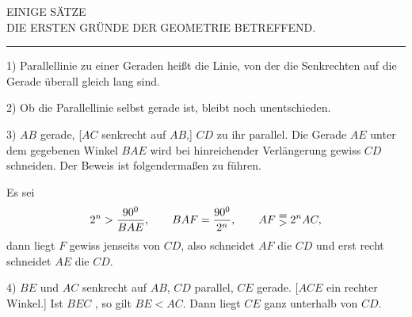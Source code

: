\clearpage
{}
\begin{center}
EINIGE SÄTZE\\
DIE ERSTEN GRÜNDE DER GEOMETRIE BETREFFEND.
\end{center}

\medskip
\begin{center}
\rule{0.15\textwidth}{0.4pt}
\end{center}
\medskip

1) Parallellinie zu einer Geraden heißt die Linie, von der die
Senkrechten auf die Gerade überall gleich lang sind.

2) Ob die Parallellinie selbst gerade ist, bleibt noch unentschieden.

3) $AB$ gerade, [$AC$ senkrecht auf $AB$,] $CD$ zu ihr parallel.
Die Gerade $AE$ unter dem gegebenen Winkel $BAE$ wird bei hinreichender Verlängerung
gewiss $CD$ schneiden. Der Beweis ist folgendermaßen zu führen.

\begin{center}\end{center}

Es sei
\[
2^n > \frac{90^{0}}{BAE}, \qquad BAF = \frac{90^{0}}{2^n}, \qquad
AF \EqualsOverGreater{} 2^n AC, 
\]
dann liegt $F$ gewiss jenseits von $CD$, also schneidet $AF$ die $CD$ und
erst recht schneidet $AE$ die $CD$.

4) $BE$ und $AC$ senkrecht auf $AB$, $CD$ parallel, $CE$ gerade.
[$ACE$ ein rechter Winkel.] Ist $BEC$ , so gilt $BE < AC$. Dann
liegt $CE$ ganz unterhalb von $CD$.

\begin{center}\end{center}

